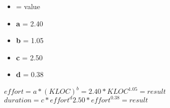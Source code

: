 \begin{itemize}
	\item {} = value
	\item \textbf{a} = 2.40
	\item \textbf{b} = 1.05
	\item \textbf{c} = 2.50
	\item \textbf{d} = 0.38
\end{itemize}

\begin{center}
$ effort = a * (KLOC)^{b} = 2.40 * KLOC^{1.05} = result $\\
$ duration = c * effort^{d} 2.50 * effort ^{0.38} = result $\\
\end{center}

